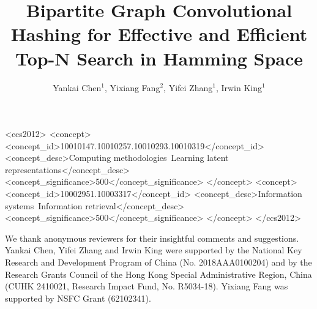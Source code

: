 \documentclass[sigconf]{acmart}
\theoremstyle{stype}
\def\cyk{\color{blue} }
\begin{document}


\title{Bipartite Graph Convolutional Hashing for Effective and Efficient Top-N Search in Hamming Space
}




\author{
Yankai Chen$^1$,
Yixiang Fang$^2$,
Yifei Zhang$^1$,
Irwin King$^1$
}

\renewcommand{\shortauthors}{Yankai Chen et al.}




\vspace{-2cm}
\begin{CCSXML}
<ccs2012>
   <concept>
       <concept_id>10010147.10010257.10010293.10010319</concept_id>
       <concept_desc>Computing methodologies~Learning latent representations</concept_desc>
       <concept_significance>500</concept_significance>
       </concept>
   <concept>
       <concept_id>10002951.10003317</concept_id>
       <concept_desc>Information systems~Information retrieval</concept_desc>
       <concept_significance>500</concept_significance>
       </concept>
 </ccs2012>
\end{CCSXML}



\maketitle









% 










\begin{acks}
We thank anonymous reviewers for their insightful comments and suggestions.
Yankai Chen, Yifei Zhang and Irwin King were supported by the National Key Research and Development Program of China (No. 2018AAA0100204) and by the Research Grants Council of the Hong Kong Special Administrative Region, China (CUHK 2410021, Research Impact Fund, No. R5034-18).
Yixiang Fang was supported by NSFC Grant (62102341).
\end{acks}



\clearpage




\clearpage

\end{document}
